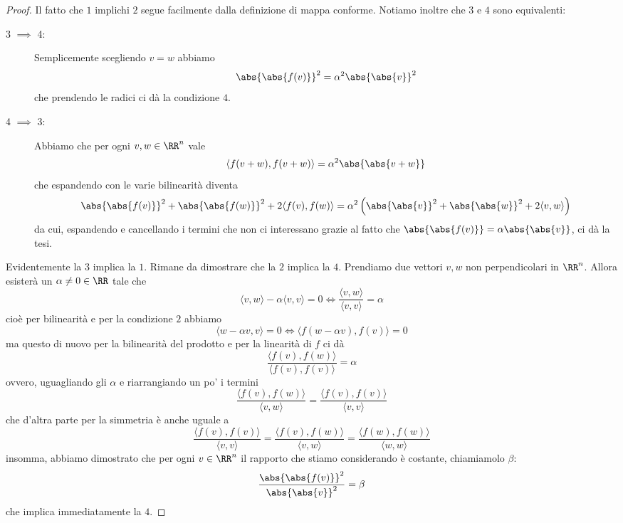 \documentclass[11pt]{scrartcl}
\begin{document}
   	 \begin{proof}
   	 	Il fatto che $1$ implichi $2$ segue facilmente dalla definizione di mappa conforme. Notiamo inoltre che $3$ e $4$ sono equivalenti: 
   	 	\begin{description}
   	 		\item[3 $\implies$ 4:] Semplicemente scegliendo $v=w$ abbiamo
   	 		$$\abs{\abs{f(v)}}^2=\alpha^2\abs{\abs{v}}^2$$
   	 		che prendendo le radici ci dà la condizione $4$.
   	 		\item[4 $\implies$ 3:] Abbiamo che per ogni $v,w\in \RR^n$ vale
   	 		$$\langle f(v+w),f(v+w)\rangle=\alpha^2 \abs{\abs{v+w}}$$
   	 		che espandendo con le varie bilinearità diventa
   	 		$$\abs{\abs{f(v)}}^2+\abs{\abs{f(w)}}^2+2\langle f(v),f(w) \rangle=\alpha^2\left(\abs{\abs{v}}^2+\abs{\abs{w}}^2+2\langle v,w\rangle\right)$$
   	 		da cui, espandendo e cancellando i termini che non ci interessano grazie al fatto che $\abs{\abs{f(v)}}=\alpha \abs{\abs{v}}$, ci dà la tesi. 
   	 	\end{description}
   	 	Evidentemente la $3$ implica la $1$. Rimane da dimostrare che la $2$ implica la $4$. Prendiamo due vettori $v,w$ non perpendicolari in $\RR^n$. Allora esisterà un $\alpha\ne 0\in \RR$ tale che 
   	 	$$\langle v,w\rangle -\alpha \langle v,v\rangle=0 \iff \frac{\langle v,w \rangle}{\langle v,v\rangle}=\alpha$$
   	 	cioè per bilinearità e per la condizione $2$ abbiamo
   	 	$$\langle w-\alpha v, v\rangle=0 \iff \langle f(w-\alpha v),f(v)\rangle=0$$	
   	 	ma questo di nuovo per la bilinearità del prodotto e per la linearità di $f$ ci dà
   	 	$$\frac{\langle f(v),f(w) \rangle}{\langle f(v),f(v)\rangle }=\alpha$$
   	 	ovvero, uguagliando gli $\alpha$ e riarrangiando un po' i termini
   	 	$$\frac{\langle f(v),f(w)\rangle}{\langle v,w\rangle}=\frac{\langle f(v),f(v)\rangle}{\langle v,v\rangle}$$
   	 	che d'altra parte per la simmetria è anche uguale a 
   	 	$$\frac{\langle f(v),f(v)\rangle}{\langle v,v\rangle}=\frac{\langle f(v),f(w)\rangle}{\langle v,w\rangle}=\frac{\langle f(w),f(w)\rangle}{\langle w,w\rangle}$$
   	 	insomma, abbiamo dimostrato che per ogni $v\in \RR^n$ il rapporto che stiamo considerando è costante, chiamiamolo $\beta$:
   	 	$$ \frac{\abs{\abs{f(v)}}^2}{\abs{\abs{v}}^2}=\beta $$
   	 	che implica immediatamente la $4$.
   	 \end{proof}
   	 
\end{document}
